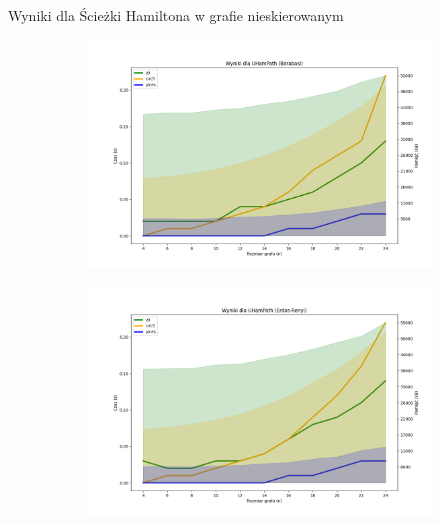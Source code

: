 \begin{frame}{Wyniki dla Ścieżki Hamiltona w grafie nieskierowanym}
	\begin{figure}[htbp]
		\centering
		\begin{subfigure}[b]{0.5\textwidth}
			\includegraphics[width=\textwidth]{../thesis/figures/2-barabasi-plot.png}
		\end{subfigure}
		\begin{subfigure}[b]{0.49\textwidth}
			\includegraphics[width=\textwidth]{../thesis/figures/2-erdos-renyi-plot.png}
		\end{subfigure}
	\end{figure}
\end{frame}
	